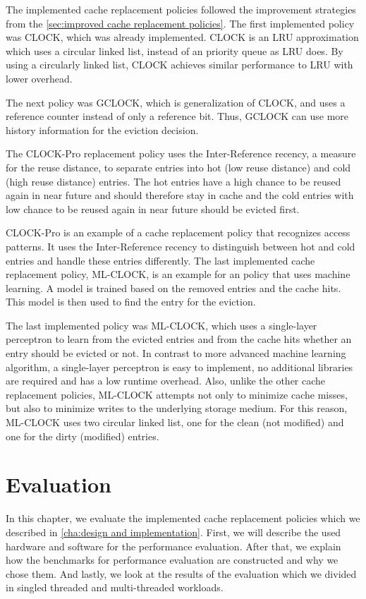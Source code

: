 \documentclass[
	12pt,
	a4paper,
	abstract,
	bibliography=totoc,
	chapterprefix,
	headings=openright,
	numbers=endperiod,
	parskip=half,
	twoside,
]{scrreprt}
\begin{document}
The implemented cache replacement policies followed the improvement strategies from the \cref{sec:improved cache replacement policies}.
The first implemented policy was CLOCK, which was already implemented.
CLOCK is an LRU approximation which uses a circular linked list, instead of an priority queue as LRU does.
By using a circularly linked list, CLOCK achieves similar performance to LRU with lower overhead.

The next policy was GCLOCK, which is generalization of CLOCK, and uses a reference counter instead of only a reference bit.
Thus, GCLOCK can use more history information for the eviction decision.

The CLOCK-Pro replacement policy uses the Inter-Reference recency, a measure for the reuse distance, to separate entries into
hot (low reuse distance) and cold (high reuse distance) entries.
The hot entries have a high chance to be reused again in near future and should therefore stay in cache and
the cold entries with low chance to be reused again in near future should be evicted first.

CLOCK-Pro is an example of a cache replacement policy that recognizes access patterns.
It uses the Inter-Reference recency to distinguish between hot and cold entries and handle these entries differently.
The last implemented cache replacement policy, ML-CLOCK, is an example for an policy that uses machine learning.
A model is trained based on the removed entries and the cache hits. 
This model is then used to find the entry for the eviction.

The last implemented policy was ML-CLOCK, which uses a single-layer perceptron to learn from the evicted entries and 
from the cache hits whether an entry should be evicted or not.
In contrast to more advanced machine learning algorithm, a single-layer perceptron is easy to implement, no additional libraries are required 
and has a low runtime overhead.
Also, unlike the other cache replacement policies, ML-CLOCK attempts not only to minimize cache misses,
but also to minimize writes to the underlying storage medium.
For this reason, ML-CLOCK uses two circular linked list, one for the clean (not modified) 
and one for the dirty (modified) entries.

\chapter{Evaluation}
\label{cha:evaluation}

In this chapter, we evaluate the implemented cache replacement policies which we described in \cref{cha:design and implementation}.
First, we will describe the used hardware and software for the performance evaluation.
After that, we explain how the benchmarks for performance evaluation are constructed and why we chose them.
And lastly, we look at the results of the evaluation which we divided in singled threaded and multi-threaded workloads.
\end{document}
